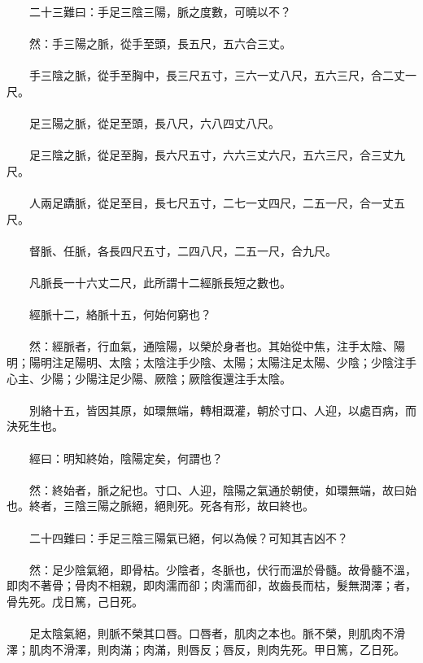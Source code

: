 　　二十三難曰：手足三陰三陽，脈之度數，可曉以不？
\\\\
　　然：手三陽之脈，從手至頭，長五尺，五六合三丈。
\\\\
　　手三陰之脈，從手至胸中，長三尺五寸，三六一丈八尺，五六三尺，合二丈一尺。
\\\\
　　足三陽之脈，從足至頭，長八尺，六八四丈八尺。
\\\\
　　足三陰之脈，從足至胸，長六尺五寸，六六三丈六尺，五六三尺，合三丈九尺。
\\\\
　　人兩足蹻脈，從足至目，長七尺五寸，二七一丈四尺，二五一尺，合一丈五尺。
\\\\
　　督脈、任脈，各長四尺五寸，二四八尺，二五一尺，合九尺。
\\\\
　　凡脈長一十六丈二尺，此所謂十二經脈長短之數也。
\\\\
　　經脈十二，絡脈十五，何始何窮也？
\\\\
　　然：經脈者，行血氣，通陰陽，以榮於身者也。其始從中焦，注手太陰、陽明；陽明注足陽明、太陰；太陰注手少陰、太陽；太陽注足太陽、少陰；少陰注手心主、少陽；少陽注足少陽、厥陰；厥陰復還注手太陰。
\\\\
　　別絡十五，皆因其原，如環無端，轉相溉灌，朝於寸口、人迎，以處百病，而決死生也。
\\\\
　　經曰：明知終始，陰陽定矣，何謂也？
\\\\
　　然：終始者，脈之紀也。寸口、人迎，陰陽之氣通於朝使，如環無端，故曰始也。終者，三陰三陽之脈絕，絕則死。死各有形，故曰終也。
\\\\
　　二十四難曰：手足三陰三陽氣已絕，何以為候？可知其吉凶不？
\\\\
　　然：足少陰氣絕，即骨枯。少陰者，冬脈也，伏行而溫於骨髓。故骨髓不溫，即肉不著骨；骨肉不相親，即肉濡而卻；肉濡而卻，故齒長而枯，髮無潤澤；者，骨先死。戊日篤，己日死。
\\\\
　　足太陰氣絕，則脈不榮其口唇。口唇者，肌肉之本也。脈不榮，則肌肉不滑澤；肌肉不滑澤，則肉滿；肉滿，則唇反；唇反，則肉先死。甲日篤，乙日死。
